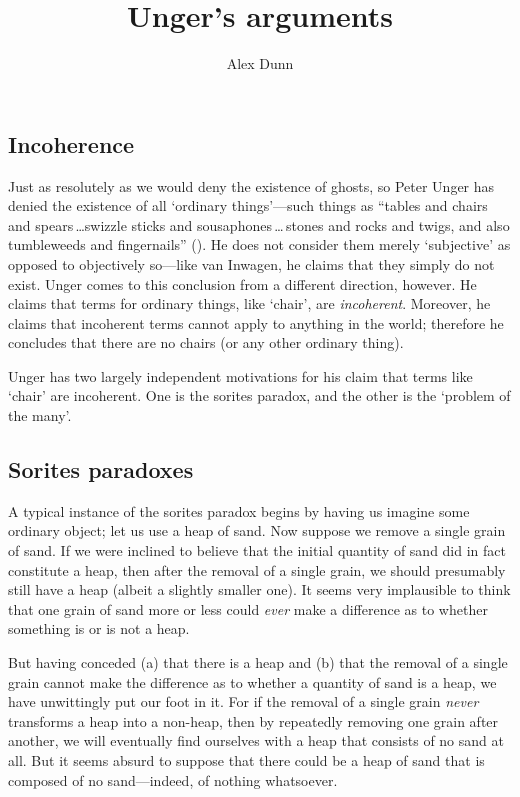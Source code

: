 \documentclass[11pt]{article}
\title{Unger's arguments}
\author{Alex Dunn}
\begin{document}
\ifstandalone
\maketitle
\begin{spacing}{1.5}
\fi

\section{Incoherence}
\label{unger}
Just as resolutely as we would deny the existence of ghosts, so Peter
Unger has denied the existence of all `ordinary things'---such things
as ``tables and chairs and spears\,\ldots swizzle sticks and
sousaphones\,\ldots\,stones and rocks and twigs, and also tumbleweeds
and fingernails'' (\citeyear[117]{unger1979}).  He does not consider
them merely `subjective' as opposed to objectively so---like van
Inwagen, he claims that they simply do not exist.  Unger comes to this
conclusion from a different direction, however.  He claims that terms
for ordinary things, like `chair', are {\em incoherent}.  Moreover, he
claims that incoherent terms cannot apply to anything in the world;
therefore he concludes that there are no chairs (or any other ordinary
thing).

Unger has two largely independent motivations for his claim that terms
like `chair' are incoherent.  One is the sorites paradox, and the
other is the `problem of the many'.

\subsection{Sorites paradoxes}
\label{sorites}
A typical instance of the sorites paradox begins by having us imagine
some ordinary object; let us use a heap of sand.  Now suppose we
remove a single grain of sand.  If we were inclined to believe that
the initial quantity of sand did in fact constitute a heap, then after
the removal of a single grain, we should presumably still have a heap
(albeit a slightly smaller one).  It seems very implausible to think
that one grain of sand more or less could {\em ever} make a difference
as to whether something is or is not a heap.

But having conceded (a) that there is a heap and (b) that the removal
of a single grain cannot make the difference as to whether a quantity
of sand is a heap, we have unwittingly put our foot in it.  For if the
removal of a single grain {\em never} transforms a heap into a
non-heap, then by repeatedly removing one grain after another, we will
eventually find ourselves with a heap that consists of no sand at
all.  But it seems absurd to suppose that there could be a heap of
sand that is composed of no sand---indeed, of nothing whatsoever.


\end{spacing}
\end{document}

